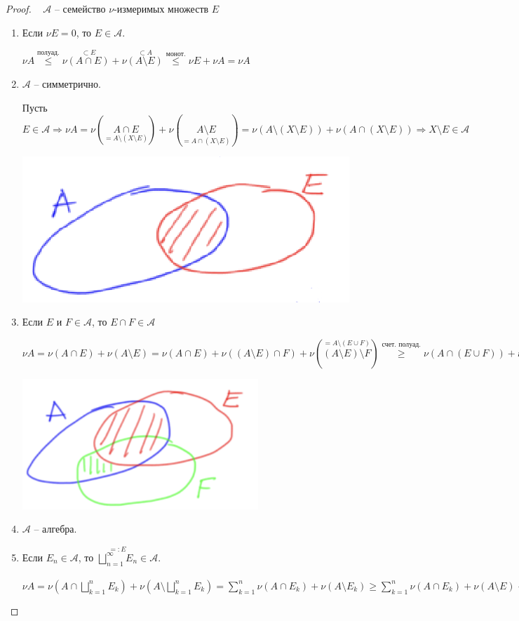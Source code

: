 \begin{proof}~
    $\mathcal{A}$ – семейство $\nu$-измеримых множеств $E$

    \begin{enumerate}
        \item Если $\nu E=0$, то $E\in \mathcal{A}$.
        
        $\nu A \overset{\text{полуад.}}{\leq} \nu \overset{\subset E}{(A\cap E)}+\nu \overset{\subset A}{(A\setminus E)}\overset{\text{монот.}}{\leq} \nu E + \nu A = \nu A$

        \item $\mathcal{A}$ – симметрично.
        
        Пусть $E\in \mathcal{A}\Rightarrow \nu A = \nu (\underset{=A\setminus(X\setminus E)}{A\cap E})+\nu (\underset{=A\cap(X\setminus E)}{A\setminus E})=
        \nu (A\setminus(X\setminus E))+\nu (A\cap(X\setminus E))\Rightarrow X\setminus E\in \mathcal{A}$

        \includegraphics[width=0.2\linewidth]{images/23-09-14-2.png}

        \item Если $E$ и $F\in \mathcal{A}$, то $E\cap F \in \mathcal{A}$
        
        $\nu A = \nu (A\cap E)+\nu (A\setminus E)= \nu (A\cap E)+\nu ((A\setminus E)\cap F)+\nu (\overset{=A\setminus (E\cup F)}{(A\setminus E)\setminus F})\overset{\text{счет. полуад.}}{\geq} 
        \nu (A\cap(E\cup F))+\nu (A\setminus (E\cup F))$

        \includegraphics[width=0.2\linewidth]{images/23-09-14-3.png}

        \item $\mathcal{A}$ – алгебра.
        \item Если $E_n\in \mathcal{A}$, то $\overset{=:E}{\bigsqcup\limits_{n=1}^\infty E_n}\in \mathcal{A}$.
        
        $\nu A=\nu (A\cap \bigsqcup\limits_{k=1}^n E_k)+\nu (A\setminus \bigsqcup\limits_{k=1}^n E_k)=
        \sum \limits_{k=1}^n \nu(A\cap E_k) + \nu (A\setminus E_k)\geq
        \sum \limits_{k=1}^n \nu(A\cap E_k) + \nu (A\setminus E)\rightarrow
        \sum \limits_{k=1}^\infty \nu(A\cap E_k) + \nu (A\setminus E)\overset{\text{счет. полуад.}}{\geq} \nu (A\cap E) + \nu (A\setminus E)$


\end{enumerate}
\end{proof}
